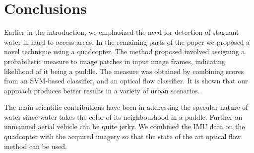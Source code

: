 \documentclass[times,10pt,twocolumn]{article}
\begin{document}
\section{Conclusions}

Earlier in the introduction, we emphasized the need for detection of
stagnant water in hard to access areas. In the remaining parts of the
paper we proposed a novel technique using a quadcopter.
The method proposed involved assigning a probabilistic measure to
image patches in input image frames, indicating likelihood of it being
a puddle. The measure was obtained by combining scores from an
SVM-based classifier, and an optical flow classifier. It is shown that
our approach produces better results in a variety of urban scenarios.

The main scientific contributions have been in addressing the specular
nature of water since water takes the color of its neighbourhood in a
puddle. Further an unmanned aerial vehicle can be quite jerky.  We
combined the IMU data on the quadcopter with the acquired imagery so
that the state of the art optical flow method can be used. 


\small


\end{document}
